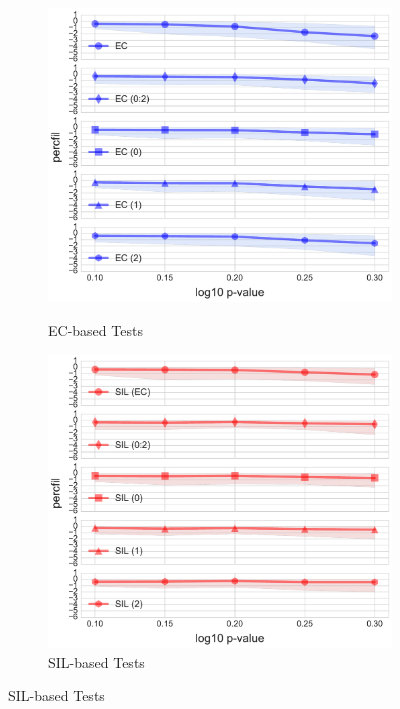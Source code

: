 \documentclass[12pt]{article}
\begin{document}
\begin{center}
  \begin{figure}[htp!]
    \centering
    \begin{subfigure}{.45\textwidth}
      \centering
      \caption{EC-based Tests}
      \includegraphics[width=\linewidth]{sub_euler_lineplot_log10_norm_True.pdf}
      \label{fig:sub_euler}
    \end{subfigure}
    \begin{subfigure}{.45\textwidth}
      \centering
      \caption{SIL-based Tests}
      \includegraphics[width=\linewidth]{sub_silh_lineplot_log10_norm_True.pdf}

\end{subfigure}
\end{figure}
\end{center}
\end{document}
